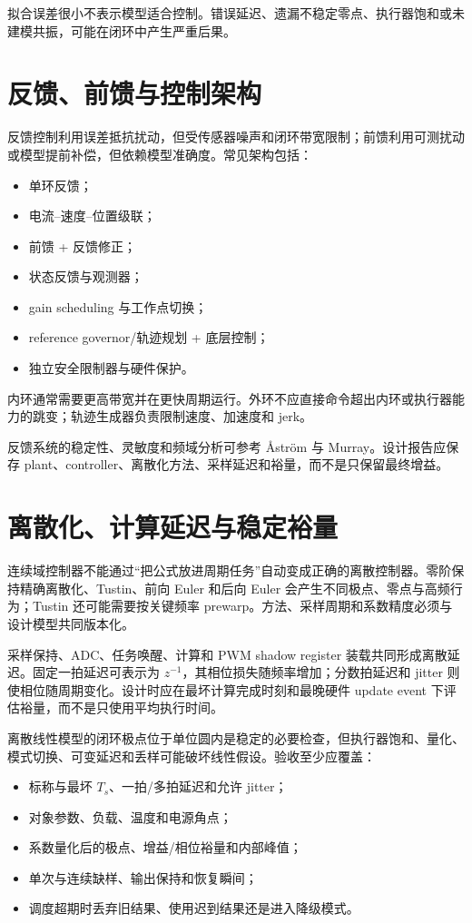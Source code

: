 拟合误差很小不表示模型适合控制。错误延迟、遗漏不稳定零点、执行器饱和或未建模共振，可能在闭环中产生严重后果。

\section{反馈、前馈与控制架构}

反馈控制利用误差抵抗扰动，但受传感器噪声和闭环带宽限制；前馈利用可测扰动或模型提前补偿，但依赖模型准确度。常见架构包括：

\begin{itemize}
  \item 单环反馈；
  \item 电流--速度--位置级联；
  \item 前馈 + 反馈修正；
  \item 状态反馈与观测器；
  \item gain scheduling 与工作点切换；
  \item reference governor/轨迹规划 + 底层控制；
  \item 独立安全限制器与硬件保护。
\end{itemize}

内环通常需要更高带宽并在更快周期运行。外环不应直接命令超出内环或执行器能力的跳变；轨迹生成器负责限制速度、加速度和 jerk。

反馈系统的稳定性、灵敏度和频域分析可参考 Åström 与 Murray\cite{astrom-murray-feedback}。设计报告应保存 plant、controller、离散化方法、采样延迟和裕量，而不是只保留最终增益。

\section{离散化、计算延迟与稳定裕量}

连续域控制器不能通过“把公式放进周期任务”自动变成正确的离散控制器。零阶保持精确离散化、Tustin、前向 Euler 和后向 Euler 会产生不同极点、零点与高频行为；Tustin 还可能需要按关键频率 prewarp。方法、采样周期和系数精度必须与设计模型共同版本化。

采样保持、ADC、任务唤醒、计算和 PWM shadow register 装载共同形成离散延迟。固定一拍延迟可表示为 $z^{-1}$，其相位损失随频率增加；分数拍延迟和 jitter 则使相位随周期变化。设计时应在最坏计算完成时刻和最晚硬件 update event 下评估裕量，而不是只使用平均执行时间。

离散线性模型的闭环极点位于单位圆内是稳定的必要检查，但执行器饱和、量化、模式切换、可变延迟和丢样可能破坏线性假设。验收至少应覆盖：
\begin{itemize}
  \item 标称与最坏 $T_s$、一拍/多拍延迟和允许 jitter；
  \item 对象参数、负载、温度和电源角点；
  \item 系数量化后的极点、增益/相位裕量和内部峰值；
  \item 单次与连续缺样、输出保持和恢复瞬间；
  \item 调度超期时丢弃旧结果、使用迟到结果还是进入降级模式。
\end{itemize}


